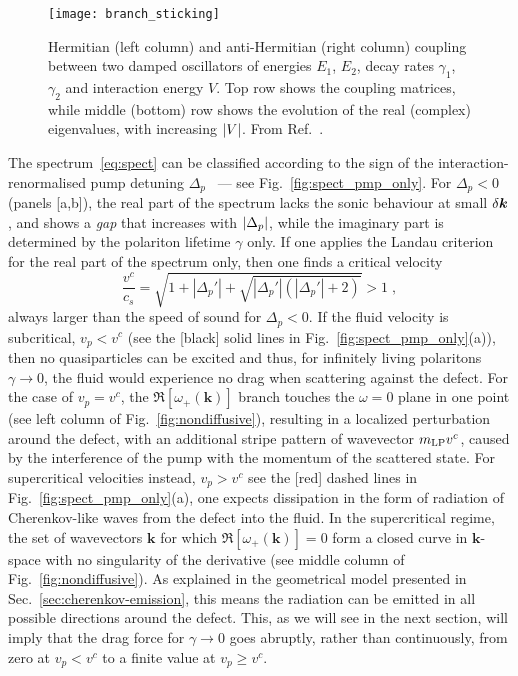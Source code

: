 %
\begin{figure}[tb]\centering
  \texttt{[image: branch\_sticking]}
  \caption{
    Hermitian (left column) and anti-Hermitian (right column) coupling
    between two damped oscillators of energies $E_1$, $E_2$, decay rates
    $\gamma_1$, $\gamma_2$ and interaction energy $V$. Top row shows the
    coupling matrices, while middle (bottom) row shows the evolution of
    the real (complex) eigenvalues, with increasing $\vert V \vert$. From
    Ref.~\cite{Ciuti_2003}.
  }\label{fig:branch-stick}
\end{figure}
% 

The spectrum~\eqref{eq:spect} can be classified according to the sign
of the interaction-renormalised pump detuning
$\Delta_p$~\cite{Carusotto_2004,Ciuti_2005} --- see
Fig.~\ref{fig:spect_pmp_only}. For $\Delta_p<0$ (panels [a,b]), the
real part of the spectrum lacks the sonic behaviour at small
$\delta \bm{k}$, and shows a \emph{gap} that increases with
$\vert \Delta_p \vert$, while the imaginary part is determined by the
polariton lifetime $\gamma$ only.
%
If one applies the Landau criterion for the real part
of the spectrum only, then one finds a critical velocity
%
\begin{equation}
  \frac{v^c}{c_s} = \sqrt{1 + |\Delta_p'| +
    \sqrt{|\Delta_p'|(|\Delta_p'| + 2)}} > 1\; ,
\label{eq:criti}
\end{equation}
%
always larger than the speed of sound for $\Delta_p<0$. 
%
If the fluid velocity is subcritical, $v_p<v^c$ (see the [black] solid
lines in Fig.~\ref{fig:spect_pmp_only}(a)), then no quasiparticles can
be excited and thus, for infinitely living polaritons $\gamma \to 0$,
the fluid would experience no drag when scattering against the
defect. 
%
For the case of $v_p = v^c$, the $\Re[\omega_{+}(\bm{k})]$ branch
touches the $\omega = 0$ plane in one point (see left column of
Fig.~\ref{fig:nondiffusive}), resulting in a localized perturbation
around the defect, with an additional stripe pattern of wavevector
$m_{\text{LP}}v^c$, caused by the interference of the pump with the momentum of
the scattered state.
%
For supercritical velocities instead, $v_p > v^c$ see the [red] dashed
lines in Fig.~\ref{fig:spect_pmp_only}(a), one expects dissipation in
the form of radiation of Cherenkov-like waves from the defect into the
fluid. In the supercritical regime, the set of wavevectors $\bm{k}$
for which $\Re[\omega_{+} (\bm{k})] = 0$ form a closed curve in
$\bm{k}$-space with no singularity of the derivative (see middle
column of Fig.~\ref{fig:nondiffusive}). As explained in the
geometrical model presented in Sec.~\ref{sec:cherenkov-emission}, this
means the radiation can be emitted in all possible directions around
the defect. This, as we will see in the next section, will imply that
the drag force for $\gamma \to 0$ goes abruptly, rather than
continuously, from zero at $v_p<v^c$ to a finite value at
$v_p \ge v^c$.

